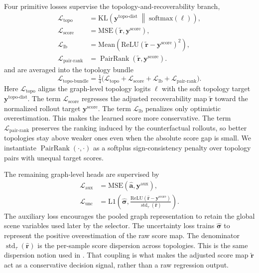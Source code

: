 \documentclass{ieeeaccess}
\begin{document}
Four primitive losses supervise the topology-and-recoverability branch,
\begin{align}
\mathcal{L}_{\mathrm{topo}}
&= \mathrm{KL}\!\left(
\mathbf{y}^{\mathrm{topo\mbox{-}dist}}
\;\middle\|\;
\mathrm{softmax}(\bm{\ell})
\right), \\
\mathcal{L}_{\mathrm{score}}
&= \mathrm{MSE}\!\left(\tilde{\mathbf{r}}, \mathbf{y}^{\mathrm{score}}\right), \\
\mathcal{L}_{\mathrm{lb}}
&= \mathrm{Mean}\!\left(
\mathrm{ReLU}\!\left(\tilde{\mathbf{r}}-\mathbf{y}^{\mathrm{score}}\right)^2
\right), \\
\mathcal{L}_{\mathrm{pair\mbox{-}rank}}
&= \operatorname{PairRank}\!\left(\tilde{\mathbf{r}}, \mathbf{y}^{\mathrm{score}}\right).
\label{eq:loss_topo_terms}
\end{align}
and are averaged into the topology bundle
\begin{equation}
\mathcal{L}_{\mathrm{topo\mbox{-}bundle}}
= \tfrac{1}{4}\bigl(
\mathcal{L}_{\mathrm{topo}}
+ \mathcal{L}_{\mathrm{score}}
+ \mathcal{L}_{\mathrm{lb}}
+ \mathcal{L}_{\mathrm{pair\mbox{-}rank}}
\bigr).
\end{equation}
Here $\mathcal{L}_{\mathrm{topo}}$ aligns the graph-level topology
logits $\bm{\ell}$ with the soft topology target
$\mathbf{y}^{\mathrm{topo\mbox{-}dist}}$. The term
$\mathcal{L}_{\mathrm{score}}$ regresses the adjusted recoverability map
$\tilde{\mathbf{r}}$ toward the normalized rollout target
$\mathbf{y}^{\mathrm{score}}$. The term
$\mathcal{L}_{\mathrm{lb}}$ penalizes only optimistic overestimation.
This makes the learned score more conservative. The term
$\mathcal{L}_{\mathrm{pair\mbox{-}rank}}$ preserves the ranking induced
by the counterfactual rollouts, so better topologies stay above weaker
ones even when the absolute score gap is small. We instantiate
$\operatorname{PairRank}(\cdot,\cdot)$ as a softplus sign-consistency
penalty over topology pairs with unequal target scores.

The remaining graph-level heads are supervised by
\begin{align}
\mathcal{L}_{\mathrm{aux}}
&= \mathrm{MSE}\!\left(\hat{\mathbf{a}}, \mathbf{y}^{\mathrm{aux}}\right), \\
\mathcal{L}_{\mathrm{unc}}
&= \mathrm{L1}\!\left(
\hat{\bm{\sigma}},
\frac{\mathrm{ReLU}\!\left(\hat{\mathbf{r}}-\mathbf{y}^{\mathrm{score}}\right)}
     {\operatorname{std}_{\tau}(\hat{\mathbf{r}})}
\right).
\label{eq:loss_aux_unc}
\end{align}
The auxiliary loss encourages the pooled graph representation to retain
the global scene variables used later by the selector. The uncertainty
loss trains $\hat{\bm{\sigma}}$ to represent the positive
overestimation of the raw score map. The denominator
$\operatorname{std}_{\tau}(\hat{\mathbf{r}})$ is the per-sample score
dispersion across topologies. This is the same dispersion notion used
in . That coupling is what makes the adjusted
score map $\tilde{\mathbf{r}}$ act as a conservative decision signal,
rather than a raw regression output.
\end{document}
